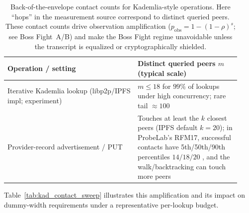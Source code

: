 \documentclass[11pt]{article}
\begin{document}
\begin{table}[t]
\centering
\begin{tabular}{@{}p{0.52\linewidth}p{0.41\linewidth}@{}}
\toprule
Operation / setting & Distinct queried peers $m$ (typical scale) \\
\midrule
Iterative Kademlia lookup (libp2p/IPFS impl; experiment) &
$m \le 18$ for $99\%$ of lookups under high concurrency; rare tail $\approx 100$ \cite{cortes2024kadlimits} \\
Provider-record advertisement / PUT &
Touches at least the $k$ closest peers (IPFS default $k{=}20$); in ProbeLab's RFM17, successful contacts have 5th/50th/90th percentiles $14/18/20$ \cite{probelab_rfm17}, and the walk/backtracking can touch more peers \cite{ipfs_kad_spec,trautwein2024ipfs} \\
\bottomrule
\end{tabular}
\caption{Back-of-the-envelope contact counts for Kademlia-style operations. Here ``hops'' in the measurement source correspond to distinct queried peers. These contact counts drive observation amplification ($p_{\mathrm{obs}}=1-(1-\rho)^s$; see Boss Fight~A/B\cite{series:bossfightA,series:bossfightB}) and make the Boss Fight regime unavoidable unless the transcript is equalized or cryptographically shielded.}
\label{tab:kad-hops-contacts}
\end{table}


Table~\ref{tab:kad_contact_sweep} illustrates this amplification and its impact on dummy-width requirements under a representative per-lookup budget.
\end{document}
